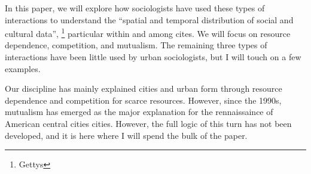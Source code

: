 In this paper, we will explore how sociologists have used these types
of interactions to understand the ``spatial and temporal distribution
of social and cultural data'', \footnote{Gettys} particular within and
among cites.  We will focus on resource dependence, competition, and
mutualism.  The remaining three types of interactions have been little
used by urban sociologists, but I will touch on a few examples.

Our discipline has mainly explained cities and urban form through
resource dependence and competition for scarce resources. However,
since the 1990s, mutualism has emerged as the major 
explanation for the rennaissaince of American central cities
cities. However, the full logic of this turn has not been developed,
and it is here where I will spend the bulk of the paper.

